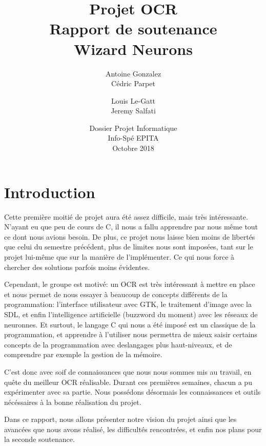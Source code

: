\documentclass[12pt]{report}
\begin{document}
\title{
	{\Huge Projet OCR}\\
	\vspace{2em}
	{\Huge Rapport de soutenance}\\
	{\large Wizard Neurons}
}
\author{
	Antoine Gonzalez\\
	Cédric Parpet
	\and
	Louis Le-Gatt\\
	Jeremy Salfati}
\date{
	\vspace{15em}
	{Dossier Projet Informatique\\
	Info-Spé EPITA\\
	Octobre 2018}
}

\maketitle
\tableofcontents

\chapter{Introduction}

Cette première moitié de projet aura été assez difficile, mais très intéressante. N'ayant eu que peu de cours de C, il nous a fallu apprendre par nous même tout ce dont nous avions besoin. De plus, ce projet nous laisse bien moins de libertés que celui du semestre précédent, plus de limites nous sont imposées, tant sur le projet lui-même que sur la manière de l'implémenter. Ce qui nous force à chercher des solutions parfois moins évidentes.

Cependant, le groupe est motivé: un OCR est très intéressant à mettre en place et nous permet de nous essayer à beaucoup de concepts différents de la programmation: l'interface utilisateur avec GTK, le traitement d'image avec la SDL, et enfin l'intelligence artificielle (buzzword du moment) avec les réseaux de neuronnes. Et surtout, le langage C qui nous a été imposé est un classique de la programmation, et apprendre à l'utiliser nous permettra de mieux saisir certains concepts de la programmation avec deslangages plus haut-niveaux, et de comprendre par exemple la gestion de la mémoire.

C'est donc avec soif de connaissances que nous nous sommes mis au travail, en quête du meilleur OCR réalisable. Durant ces premières semaines, chacun a pu expérimenter avec sa partie. Nous possédons désormais les connaissances et outils nécéssaires à la bonne réalisation du projet.

Dans ce rapport, nous allons présenter notre vision du projet ainsi que les avancées que nous avons réalisé, les difficultés rencontrées, et enfin nos plans pour la seconde soutenance.
\end{document}
